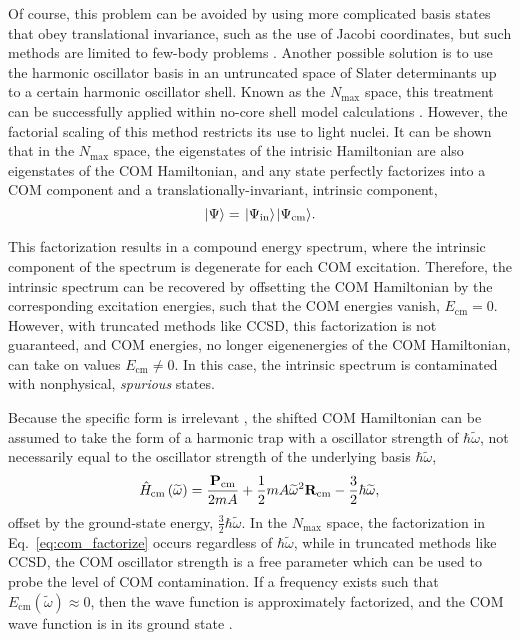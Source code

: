 \documentclass[thesis.tex]{subfiles}
\begin{document}
Of course, this problem can be avoided by using more complicated basis states that obey translational invariance, such as the use of Jacobi coordinates, but such methods are limited to few-body problems \cite{BISHOP19901341,NOGGA2002054003}.  Another possible solution is to use the harmonic oscillator basis in an untruncated space of Slater determinants up to a certain harmonic oscillator shell.  Known as the $N_{\mathrm{max}}$ space, this treatment can be successfully applied within no-core shell model calculations \cite{NAVRATIL2009083101}. However, the factorial scaling of this method restricts its use to light nuclei.  It can be shown that in the $N_{\mathrm{max}}$ space, the eigenstates of the intrisic Hamiltonian are also eigenstates of the COM Hamiltonian, and any state perfectly factorizes into a COM component and a translationally-invariant, intrinsic component,
\begin{equation} \label{eq:com_factorize}
  \hspace{1pt}\lvert \Psi \rangle = \hspace{1pt}\lvert \Psi_{\mathrm{in}} \rangle\hspace{1pt}\lvert \Psi_{\mathrm{cm}} \rangle.
\end{equation}

This factorization results in a compound energy spectrum, where the intrinsic component of the spectrum is degenerate for each COM excitation.  Therefore, the intrinsic spectrum can be recovered by offsetting the COM Hamiltonian by the corresponding excitation energies, such that the COM energies vanish, $E_{\mathrm{cm}} = 0$.  However, with truncated methods like CCSD, this factorization is not guaranteed, and COM energies, no longer eigenenergies of the COM Hamiltonian, can take on values $E_{\mathrm{cm}} \neq 0$.  In this case, the intrinsic spectrum is contaminated with nonphysical, \textit{spurious} states.

Because the specific form is irrelevant \cite{VINCENT2973}, the shifted COM Hamiltonian can be assumed to take the form of a harmonic trap with a oscillator strength of $\hbar\widetilde{\omega}$, not necessarily equal to the oscillator strength of the underlying basis $\hbar\widetilde{\omega}$,
\begin{equation} \label{eq:com_hamiltonian}
  \hat{H}\hspace{-1pt}_{\mathrm{cm}}\left(\widetilde{\omega}\right) = \frac{\mathbf{P}_{\mathrm{cm}}}{2mA} + \frac{1}{2}mA\widetilde{\omega}^{2}\mathbf{R}_{\mathrm{cm}} - \frac{3}{2}\hbar\widetilde{\omega},
\end{equation}
offset by the ground-state energy, $\frac{3}{2}\hbar\widetilde{\omega}$.  In the $N_{\mathrm{max}}$ space, the factorization in Eq.\ \eqref{eq:com_factorize} occurs regardless of $\hbar\widetilde{\omega}$, while in truncated methods like CCSD, the COM oscillator strength is a free parameter which can be used to probe the level of COM contamination.  If a frequency exists such that $E_{\mathrm{cm}}\left(\widetilde{\omega}\right) \approx 0$, then the wave function is approximately factorized, and the COM wave function is in its ground state \cite{HAGEN2009062503,JANSEN2013}.
\end{document}
